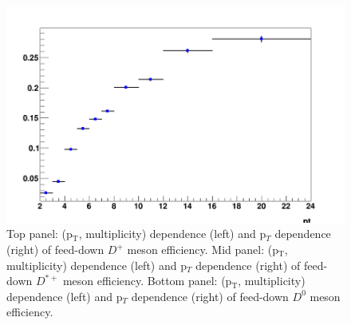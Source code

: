 \begin{figure}[h]
	\includegraphics[width=.48\linewidth]{figures/Effs/EfficiencyMap_1D_Dzero_b_Ref_wLimAcc_Plot.png}
	\caption{Top panel: (p$_\mathrm{T}$, multiplicity) dependence (left) and p$_T$ dependence (right) of feed-down $D^{+}$ meson efficiency. 
Mid panel: (p$_\mathrm{T}$, multiplicity) dependence (left) and p$_T$ dependence (right) of feed-down $D^{*+}$ meson efficiency. 
Bottom panel: (p$_\mathrm{T}$, multiplicity) dependence (left) and p$_T$ dependence (right) of feed-down $D^{0}$ meson efficiency.}
	\label{fig:dpluseff}	
\end{figure}

